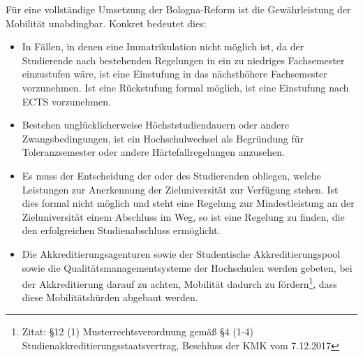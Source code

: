 Für eine vollständige Umsetzung der Bologna-Reform ist die Gewährleistung der
Mobilität unabdingbar. Konkret bedeutet dies:
\begin{itemize}

\item In Fällen, in denen eine Immatrikulation nicht möglich ist, da der Studierende
  nach bestehenden Regelungen in ein zu niedriges Fachsemester einzustufen wäre,
  ist eine Einstufung in das nächsthöhere Fachsemester vorzunehmen. Ist eine
  Rückstufung formal möglich, ist eine Einstufung nach ECTS vorzunehmen.
\item Bestehen unglücklicherweise Höchststudiendauern oder andere Zwangsbedingungen,
  ist ein Hochschulwechsel als Begründung für Toleranzsemester oder andere
  Härtefallregelungen anzusehen.
\item Es muss der Entscheidung der oder des Studierenden obliegen, welche Leistungen
  zur Anerkennung der Zieluniversität zur Verfügung stehen. Ist dies formal
  nicht möglich und steht eine Regelung zur Mindestleistung an der
  Zieluniversität einem Abschluss im Weg, so ist eine Regelung zu finden, die
  den erfolgreichen Studienabschluss ermöglicht.
\item Die Akkreditierungsagenturen sowie der Studentische Akkreditierungspool sowie die Qualitätsmanagementsysteme der Hochschulen werden
  gebeten, bei der Akkreditierung darauf zu achten, Mobilität dadurch zu
  fördern\footnote{Zitat: §12 (1) Musterrechtsverordnung gemäß §4 (1-4)
    Studienakkreditierungsstaatsvertrag, Beschluss der KMK vom 7.12.2017}, dass diese Mobilitätshürden abgebaut werden.
 \end{itemize}
